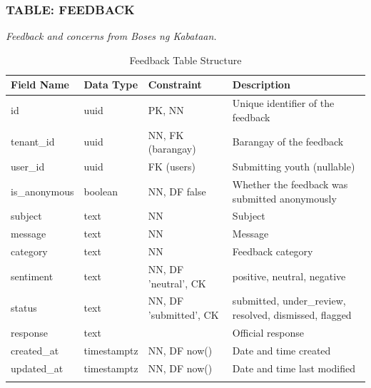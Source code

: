 \subsubsection*{TABLE: FEEDBACK}
\noindent\textit{Feedback and concerns from Boses ng Kabataan.}
\begin{longtable}{|p{3.2cm}|p{2.2cm}|p{3.2cm}|p{5.4cm}|}
\hline
\textbf{Field Name} & \textbf{Data Type} & \textbf{Constraint} & \textbf{Description} \\ \hline
\endhead
\hline \endfoot
\hline \endlastfoot
id & uuid & PK, NN & Unique identifier of the feedback \\ \hline
tenant\_id & uuid & NN, FK (barangay) & Barangay of the feedback \\ \hline
user\_id & uuid & FK (users) & Submitting youth (nullable) \\ \hline
is\_anonymous & boolean & NN, DF false & Whether the feedback was submitted anonymously \\ \hline
subject & text & NN & Subject \\ \hline
message & text & NN & Message \\ \hline
category & text & NN & Feedback category \\ \hline
sentiment & text & NN, DF 'neutral', CK & positive, neutral, negative \\ \hline
status & text & NN, DF 'submitted', CK & submitted, under\_review, resolved, dismissed, flagged \\ \hline
response & text & & Official response \\ \hline
created\_at & timestamptz & NN, DF now() & Date and time created \\ \hline
updated\_at & timestamptz & NN, DF now() & Date and time last modified \\ \hline
\caption{Feedback Table Structure}
\label{tab:feedback}
\end{longtable}
\vspace{3mm}

